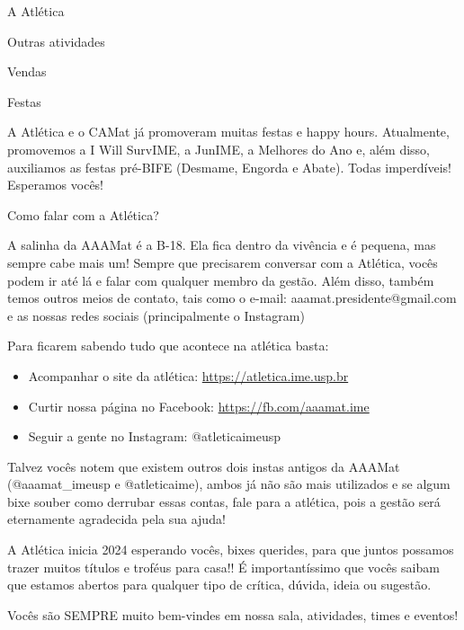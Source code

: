 \begin{secao}{A Atlética}
\begin{subsecao}{Outras atividades}
\begin{subsubsecao}{Vendas}
\end{subsubsecao}
\begin{subsubsecao}{Festas}

A Atlética e o CAMat já promoveram muitas festas e happy hours. Atualmente,
promovemos a I Will SurvIME, a JunIME, a Melhores do Ano e, além disso, 
auxiliamos as festas pré-BIFE (Desmame, Engorda e Abate). Todas imperdíveis!
Esperamos vocês!

\end{subsubsecao}
\begin{subsubsecao}{Como falar com a Atlética?}

A salinha da AAAMat é a B-18. Ela fica dentro da vivência e é pequena, mas
sempre cabe mais um! Sempre que precisarem conversar com a Atlética, vocês
podem ir até lá e falar com qualquer membro da gestão. Além disso, também temos
outros meios de contato, tais como o e-mail: aaamat.presidente@gmail.com  e as
nossas redes sociais (principalmente o Instagram)

Para ficarem sabendo tudo que acontece na atlética basta:

\begin{itemize}
  \item Acompanhar o site da atlética: \url{https://atletica.ime.usp.br}
  \item Curtir nossa página no Facebook: \url{https://fb.com/aaamat.ime}
  \item Seguir a gente no Instagram: @atleticaimeusp
\end{itemize}

Talvez vocês notem que existem outros dois instas antigos da AAAMat
(@aaamat\_imeusp e @atleticaime), ambos já não são mais utilizados
e se algum bixe souber como derrubar essas contas, fale para a atlética, 
pois a gestão será eternamente agradecida pela sua ajuda! 

A Atlética inicia 2024 esperando vocês, bixes querides, para que juntos
possamos trazer muitos títulos e troféus para casa!! É importantíssimo que
vocês saibam que estamos abertos para qualquer tipo de crítica, dúvida, ideia
ou sugestão.

Vocês são SEMPRE muito bem-vindes em nossa sala, atividades, times e eventos!
\end{subsubsecao}
\end{subsecao}
\end{secao}
\pagebreak
